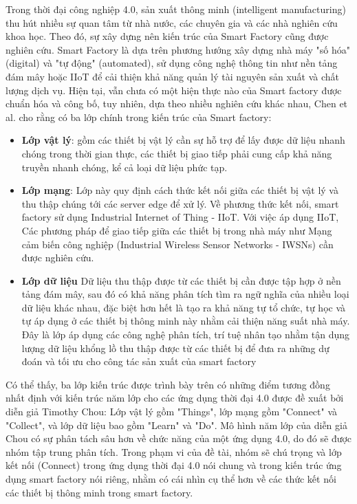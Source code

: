 Trong thời đại công nghiệp 4.0, sản xuất thông minh (intelligent manufacturing) thu hút nhiều sự quan tâm từ nhà nước, các chuyên gia và các nhà nghiên cứu khoa học. Theo đó, sự xây dựng nên kiến trúc của Smart Factory cũng được nghiên cứu. Smart Factory là dựa trên phương hướng xây dựng nhà máy "số hóa" (digital) và "tự động" (automated), sử dụng công nghệ thông tin như nền tảng đám mây hoặc IIoT để cải thiện khả năng quản lý tài nguyên sản xuất và chất lượng dịch vụ. \cite{chen} Hiện tại, vẫn chưa có một hiện thực nào của Smart factory được chuẩn hóa và công bố, tuy nhiên, dựa theo nhiều nghiên cứu khác nhau, Chen et al. \cite{chen} cho rằng có ba lớp chính trong kiến trúc của Smart factory:
\begin{itemize}
    \item \textbf{Lớp vật lý}: gồm các thiết bị vật lý cần sự hỗ trợ để lấy được dữ liệu nhanh chóng trong thời gian thực, các thiết bị giao tiếp phải cung cấp khả năng truyền nhanh chóng, kể cả loại dữ liệu phức tạp.
    \item \textbf{Lớp mạng}: Lớp này quy định cách thức kết nối giữa các thiết bị vật lý và thu thập chúng tới các server edge để xử lý. Về phương thức kết nối, smart factory sử dụng Industrial Internet of Thing - IIoT. Với việc áp dụng IIoT, Các phương pháp để giao tiếp giữa các thiết bị trong nhà máy như Mạng cảm biến công nghiệp (Industrial Wireless Sensor Networks - IWSNs) cần được nghiên cứu.
    \item \textbf{Lớp dữ liệu} Dữ liệu thu thập được từ các thiết bị cần được tập hợp ở nền tảng đám mây, sau đó có khả năng phân tích tìm ra ngữ nghĩa của nhiều loại dữ liệu khác nhau, đặc biệt hơn hết là tạo ra khả năng tự tổ chức, tự học và tự áp dụng ở các thiết bị thông minh này nhằm cải thiện năng suất nhà máy. Đây là lớp áp dụng các công nghệ phân tích, trí tuệ nhân tạo nhằm tận dụng lượng dữ liệu khổng lồ thu thập được từ các thiết bị để đưa ra những dự đoán và tối ưu cho công tác sản xuất của smart factory
\end{itemize}

Có thể thấy, ba lớp kiến trúc được trình bày trên có những điểm tương đồng nhất định với kiến trúc năm lớp cho các ứng dụng thời đại 4.0 được đề xuất bởi diễn giả Timothy Chou: Lớp vật lý gồm "Things", lớp mạng gồm "Connect" và "Collect", và lớp dữ liệu bao gồm "Learn" và "Do". Mô hình năm lớp của diễn giả Chou có sự phân tách sâu hơn về chức năng của một ứng dụng 4.0, do đó sẽ được nhóm tập trung phân tích. Trong phạm vi của đề tài, nhóm sẽ chú trọng và lớp kết nối (Connect) trong ứng dụng thời đại 4.0 nói chung và trong kiến trúc ứng dụng smart factory nói riêng, nhằm có cái nhìn cụ thể hơn về các thức kết nối các thiết bị thông minh trong smart factory.

